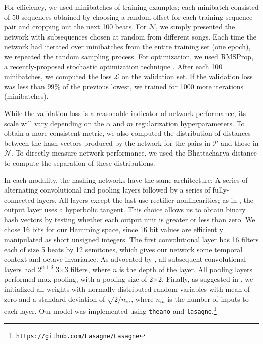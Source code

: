 \documentclass{article}
\begin{document}
For efficiency, we used minibatches of training examples; each minibatch consisted of 50 sequences obtained by choosing a random offset for each training sequence pair and cropping out the next 100 beats.  
For $\mathcal{N}$, we simply presented the network with subsequences chosen at random from different songs. 
Each time the network had iterated over minibatches from the entire training set (one epoch), we repeated the random sampling process. 
For optimization, we used RMSProp, a recently-proposed stochastic optimization technique \cite{tieleman2012lecture}.
After each 100 minibatches, we computed the loss $\mathcal{L}$ on the validation set.
If the validation loss was less than $99\%$ of the previous lowest, we trained for 1000 more iterations (minibatches).

While the validation loss is a reasonable indicator of network performance, its scale will vary depending on the $\alpha$ and $m$ regularization hyperparameters.
To obtain a more consistent metric, we also computed the distribution of distances between the hash vectors produced by the network for the pairs in $\mathcal{P}$ and those in $\mathcal{N}$.
To directly measure network performance, we used the Bhattacharya distance \cite{bhattacharyya1943measure} to compute the separation of these distributions.

In each modality, the hashing networks have the same architecture: A series of alternating convolutional and pooling layers followed by a series of fully-connected layers.
All layers except the last use rectifier nonlinearities; as in \cite{masci2014multimodal}, the output layer uses a hyperbolic tangent.
This choice allows us to obtain binary hash vectors by testing whether each output unit is greater or less than zero.
We chose 16 bits for our Hamming space, since 16 bit values are efficiently manipulated as short unsigned integers.
The first convolutional layer has 16 filters each of size 5 beats by 12 semitones, which gives our network some temporal context and octave invariance.
As advocated by \cite{simonyan2014very}, all subsequent convolutional layers had $2^{n + 3}$ 3$\times$3 filters, where $n$ is the depth of the layer.
All pooling layers performed max-pooling, with a pooling size of 2$\times$2.
Finally, as suggested in \cite{he2015delving}, we initialized all weights with normally-distributed random variables with mean of zero and a standard deviation of $\sqrt{2/n_{in}}$, where $n_{in}$ is the number of inputs to each layer.
Our model was implemented using \texttt{theano} \cite{bastien2012theano} and \texttt{lasagne}.\footnote{\texttt{https://github.com/Lasagne/Lasagne}}
\end{document}
